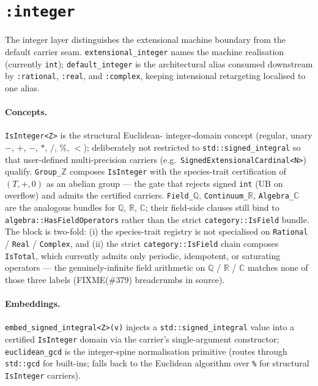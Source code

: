 \documentclass[11pt, a4paper]{report}
\begin{document}
\section{\texttt{:integer}}
\label{sec:numbers-integer}

The integer layer distinguishes the extensional machine boundary from the
default carrier seam. \texttt{extensional\_integer} names the machine
realisation (currently \texttt{int}); \texttt{default\_integer} is the
architectural alias consumed downstream by \texttt{:rational}, \texttt{:real},
and \texttt{:complex}, keeping intensional retargeting localised to one alias.

\paragraph{Concepts.} \texttt{IsInteger<Z>} is the structural Euclidean-
integer-domain concept (regular, unary $-$, $+$, $-$, $*$, $/$, $\%$, $<$);
deliberately not restricted to \texttt{std::signed\_integral} so that
user-defined multi-precision carriers (e.g.\ \texttt{SignedExtensionalCardinal<N>})
qualify. \texttt{Group\_$\mathbb{Z}$} composes \texttt{IsInteger} with the
species-trait certification of $(T, +, 0)$ as an abelian group --- the gate
that rejects signed \texttt{int} (UB on overflow) and admits the certified
carriers. \texttt{Field\_$\mathbb{Q}$}, \texttt{Continuum\_$\mathbb{R}$},
\texttt{Algebra\_$\mathbb{C}$} are the analogous bundles for $\mathbb{Q}$,
$\mathbb{R}$, $\mathbb{C}$; their field-side clauses still bind to
\texttt{algebra::HasFieldOperators} rather than the strict
\texttt{category::IsField} bundle. The block is two-fold: (i)
the species-trait registry is not specialised on \texttt{Rational} /
\texttt{Real} / \texttt{Complex}, and (ii) the strict \texttt{category::IsField}
chain composes \texttt{IsTotal}, which currently admits only
periodic, idempotent, or saturating operators --- the genuinely-infinite
field arithmetic on $\mathbb{Q}$ / $\mathbb{R}$ / $\mathbb{C}$ matches none
of those three labels (FIXME(\#379) breadcrumbs in source).

\paragraph{Embeddings.} \texttt{embed\_signed\_integral<Z>(v)} injects a
\texttt{std::signed\_integral} value into a certified \texttt{IsInteger}
domain via the carrier's single-argument constructor;
\texttt{euclidean\_gcd} is the integer-spine normalisation primitive (routes
through \texttt{std::gcd} for built-ins; falls back to the Euclidean algorithm
over \texttt{\%} for structural \texttt{IsInteger} carriers).
\end{document}

